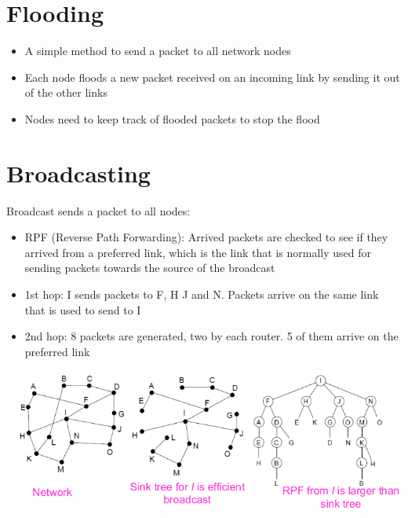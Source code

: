 \documentclass{article}[18pt]
\begin{document}
\section{Flooding}
\begin{itemize}
	\item A simple method to send a packet to all network nodes
	\item Each node floods a new packet received on an incoming link by sending it out of the other links
	\item Nodes need to keep track of flooded packets to stop the flood
\end{itemize}
\section{Broadcasting}
Broadcast sends a packet to all nodes:
\begin{itemize}
	\item RPF (Reverse Path Forwarding): Arrived packets are checked to see if they arrived from a preferred link, which is the link that is normally used for sending packets towards the source of the broadcast
	\item 1st hop: I sends packets to F, H J and N. Packets arrive on the same link that is used to send to I
	\item 2nd hop: 8 packets are generated, two by each router. 5 of them arrive on the preferred link
\end{itemize}
\begin{center}
	\includegraphics[scale=0.7]{Broadcast}
\end{center}
\end{document}
